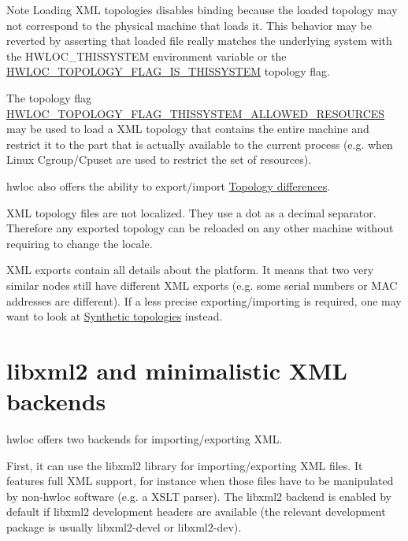 \begin{DoxyNote}{Note}
Loading X\+ML topologies disables binding because the loaded topology may not correspond to the physical machine that loads it. This behavior may be reverted by asserting that loaded file really matches the underlying system with the H\+W\+L\+O\+C\+\_\+\+T\+H\+I\+S\+S\+Y\+S\+T\+EM environment variable or the \hyperlink{a00193_ggada025d3ec20b4b420f8038d23d6e7bdea6ecb6abc6a0bb75e81564f8bca85783b}{H\+W\+L\+O\+C\+\_\+\+T\+O\+P\+O\+L\+O\+G\+Y\+\_\+\+F\+L\+A\+G\+\_\+\+I\+S\+\_\+\+T\+H\+I\+S\+S\+Y\+S\+T\+EM} topology flag.

The topology flag \hyperlink{a00193_ggada025d3ec20b4b420f8038d23d6e7bdea1b66bbd66e900e5c837f71defb32ad89}{H\+W\+L\+O\+C\+\_\+\+T\+O\+P\+O\+L\+O\+G\+Y\+\_\+\+F\+L\+A\+G\+\_\+\+T\+H\+I\+S\+S\+Y\+S\+T\+E\+M\+\_\+\+A\+L\+L\+O\+W\+E\+D\+\_\+\+R\+E\+S\+O\+U\+R\+C\+ES} may be used to load a X\+ML topology that contains the entire machine and restrict it to the part that is actually available to the current process (e.\+g. when Linux Cgroup/\+Cpuset are used to restrict the set of resources).

hwloc also offers the ability to export/import \hyperlink{a00225}{Topology differences}.

X\+ML topology files are not localized. They use a dot as a decimal separator. Therefore any exported topology can be reloaded on any other machine without requiring to change the locale.

X\+ML exports contain all details about the platform. It means that two very similar nodes still have different X\+ML exports (e.\+g. some serial numbers or M\+AC addresses are different). If a less precise exporting/importing is required, one may want to look at \hyperlink{a00389}{Synthetic topologies} instead.
\end{DoxyNote}
 \hypertarget{a00388_xml_backends}{}\section{libxml2 and minimalistic X\+M\+L backends}\label{a00388_xml_backends}
hwloc offers two backends for importing/exporting X\+ML.

First, it can use the libxml2 library for importing/exporting X\+ML files. It features full X\+ML support, for instance when those files have to be manipulated by non-\/hwloc software (e.\+g. a X\+S\+LT parser). The libxml2 backend is enabled by default if libxml2 development headers are available (the relevant development package is usually {\ttfamily libxml2-\/devel} or {\ttfamily libxml2-\/dev}).

